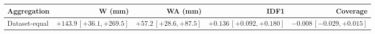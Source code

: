 \begin{tabular}{lrrrr}
\toprule
Aggregation & W (mm) & WA (mm) & IDF1 & Coverage \\
\midrule
Dataset-equal & $+143.9\,[+36.1,+269.5]$ & $+57.2\,[+28.6,+87.5]$ & $+0.136\,[+0.092,+0.180]$ & $-0.008\,[-0.029,+0.015]$ \\
\bottomrule
\end{tabular}
